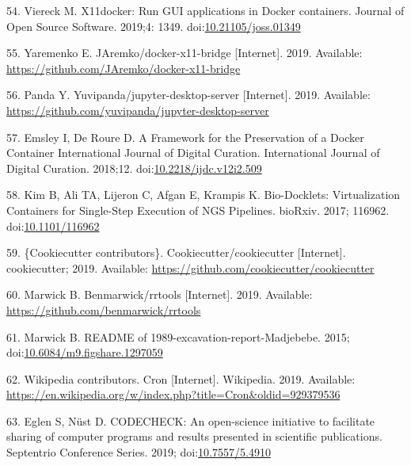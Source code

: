 \documentclass[10pt,letterpaper]{article}
\begin{document}
\leavevmode\hypertarget{ref-viereck_x11docker_2019}{}%
54. Viereck M. X11docker: Run GUI applications in Docker containers.
Journal of Open Source Software. 2019;4: 1349.
doi:\href{https://doi.org/10.21105/joss.01349}{10.21105/joss.01349}

\leavevmode\hypertarget{ref-yaremenko_docker-x11-bridge_2019}{}%
55. Yaremenko E. JAremko/docker-x11-bridge {[}Internet{]}. 2019.
Available: \url{https://github.com/JAremko/docker-x11-bridge}

\leavevmode\hypertarget{ref-yuvipanda_jupyter-desktop-server_2019}{}%
56. Panda Y. Yuvipanda/jupyter-desktop-server {[}Internet{]}. 2019.
Available: \url{https://github.com/yuvipanda/jupyter-desktop-server}

\leavevmode\hypertarget{ref-emsley_framework_2018}{}%
57. Emsley I, De Roure D. A Framework for the Preservation of a Docker
Container International Journal of Digital Curation. International
Journal of Digital Curation. 2018;12.
doi:\href{https://doi.org/10.2218/ijdc.v12i2.509}{10.2218/ijdc.v12i2.509}

\leavevmode\hypertarget{ref-kim_bio-docklets_2017}{}%
58. Kim B, Ali TA, Lijeron C, Afgan E, Krampis K. Bio-Docklets:
Virtualization Containers for Single-Step Execution of NGS Pipelines.
bioRxiv. 2017; 116962.
doi:\href{https://doi.org/10.1101/116962}{10.1101/116962}

\leavevmode\hypertarget{ref-cookiecutter_contributors_cookiecutter_2019}{}%
59. \{Cookiecutter contributors\}. Cookiecutter/cookiecutter
{[}Internet{]}. cookiecutter; 2019. Available:
\url{https://github.com/cookiecutter/cookiecutter}

\leavevmode\hypertarget{ref-marwick_rrtools_2019}{}%
60. Marwick B. Benmarwick/rrtools {[}Internet{]}. 2019. Available:
\url{https://github.com/benmarwick/rrtools}

\leavevmode\hypertarget{ref-marwick_readme_2015}{}%
61. Marwick B. README of 1989-excavation-report-Madjebebe. 2015;
doi:\href{https://doi.org/10.6084/m9.figshare.1297059}{10.6084/m9.figshare.1297059}

\leavevmode\hypertarget{ref-wikipedia_contributors_cron_2019}{}%
62. Wikipedia contributors. Cron {[}Internet{]}. Wikipedia. 2019.
Available:
\url{https://en.wikipedia.org/w/index.php?title=Cron\&oldid=929379536}

\leavevmode\hypertarget{ref-eglen_codecheck_2019}{}%
63. Eglen S, Nüst D. CODECHECK: An open-science initiative to facilitate
sharing of computer programs and results presented in scientific
publications. Septentrio Conference Series. 2019;
doi:\href{https://doi.org/10.7557/5.4910}{10.7557/5.4910}
\end{document}
